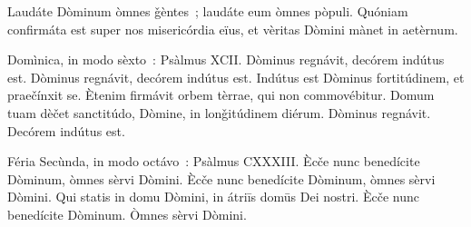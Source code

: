 \prayerVersicleResponse
{Laudáte Dòminum òmnes ǧèntes~; laudáte eum òmnes pòpuli.}
{Quóniam confirmáta est super nos misericórdia eïus, et vèritas Dòmini mànet in aetèrnum.}

\prayerVersicleResponseGloriaPatri

\vfill

\horizontalRule

\vfill



\vfill\vfill

\newpage

\vfill

\antiphonSundayVespers
{Domìnica, in modo sèxto~:}
{Psàlmus XCII.}
{Dòminus regnávit, decórem indútus est.}
{Dòminus regnávit, \symbolBreak decórem indútus est.}
{Indútus est Dòminus fortitúdinem, et praečínxit se.}
{Ètenim firmávit orbem tèrrae, qui non commovébitur.}
{Domum tuam dèčet sanctitúdo, Dòmine, in lonǧitúdinem diérum.}
{Dòminus regnávit.}
{Decórem indútus est.}
\vfill

\antiphonDayOfWeek
{Féria Secùnda, in modo octávo~:}
{Psàlmus CXXXIII.}
{Ècče nunc benedícite Dòminum, òmnes sèrvi Dòmini.}
{Ècče nunc benedícite Dòminum, \symbolBreak òmnes sèrvi Dòmini.}
{Qui statis in domu Dòmini, in átriīs domūs Dei nostri.}
{Ècče nunc benedícite Dòminum.}
{Òmnes sèrvi Dòmini.}
\vfill

